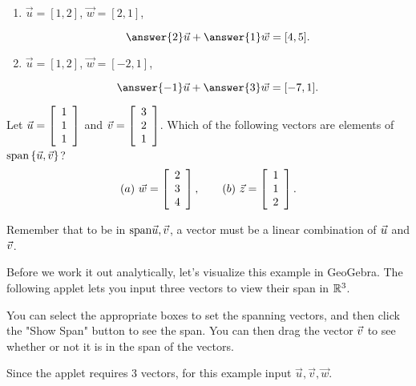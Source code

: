 \documentclass{ximera}
\begin{document}
\begin{exploration}
\begin{example}
\begin{enumerate}
    \item $\vec{u}=[1,2]$, $\vec{w}=[2,1]$, 
    
    $$\answer{2}\vec{u}+\answer{1}\vec{w}=[4,5].$$

    \item $\vec{u}=[1,2]$, $\vec{w}=[-2,1]$,
    
    $$\answer{-1}\vec{u}+\answer{3}\vec{w}=[-7,1].$$

  \end{enumerate}

\end{example}

\begin{example}
  Let $\vect{u}=\startmat{r} 1 \\ 1 \\ 1 \stopmat$ and
  $\vect{v}=\startmat{r} 3 \\ 2 \\ 1 \stopmat$. Which
  of the following vectors are elements of
  $\sspan\set{\vect{u},\vect{v}}$?
  \begin{equation*}
    (a)\quad\vect{w} = \startmat{r} 2 \\ 3 \\ 4 \stopmat,
    \qquad
    (b)\quad\vect{z} = \startmat{r} 1 \\ 1 \\ 2 \stopmat.
  \end{equation*}

  \begin{hint}
  
    Remember that to be in $\sspan{\vect{u},\vect{v}}$, a vector must be a linear combination of $\vect{u}$ and $\vect{v}$.

  \end{hint}

  \begin{solution}

  Before we work it out analytically, let's visualize this example in GeoGebra. The following applet lets you input three vectors to view their span in $\R^3$.

  You can select the appropriate boxes to set the spanning vectors, and then click the "Show Span" button to see the span. You can then drag the vector $\vect{v}$ to see whether or not it is in the span of the vectors.

  Since the applet requires 3 vectors, for this example input $\vec{u}, \vec{v}, \vec{w}$. 

  \begin{center}
  \end{center}


\end{solution}
\end{example}
\end{exploration}
\end{document}
